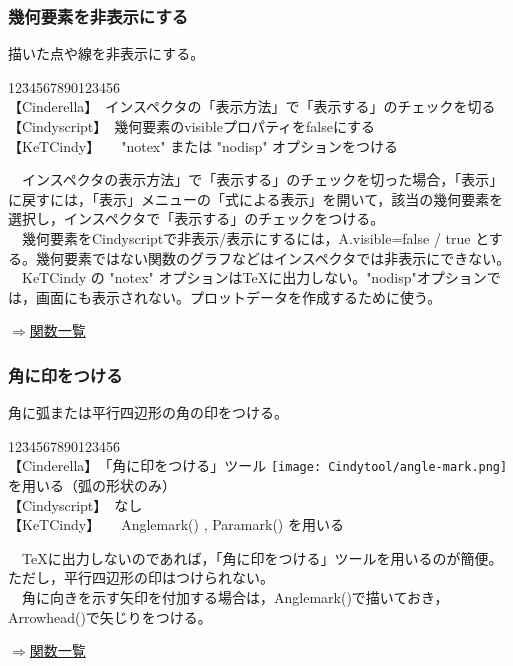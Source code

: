 \documentclass[papersize,a4paper,12pt,uplatex]{jsarticle}
\begin{document}
\subsubsection{幾何要素を非表示にする}
描いた点や線を非表示にする。
\begin{tabbing}
12\=34567890123456\=\kill\\

\>【Cinderella】　\>インスペクタの「表示方法」で「表示する」のチェックを切る　\\ 
\>【Cindyscript】　\>幾何要素のvisibleプロパティをfalseにする　\\
 \>【KeTCindy】　　\>"notex" または "nodisp" オプションをつける 　\\
\end{tabbing}
　インスペクタの表示方法」で「表示する」のチェックを切った場合，「表示」に戻すには，「表示」メニューの「式による表示」を開いて，該当の幾何要素を選択し，インスペクタで「表示する」のチェックをつける。\\
　幾何要素をCindyscriptで非表示/表示にするには，A.visible=false / true とする。幾何要素ではない関数のグラフなどはインスペクタでは非表示にできない。\\
　KeTCindy の "notex" オプションはTeXに出力しない。"nodisp"オプションでは，画面にも表示されない。プロットデータを作成するために使う。\\
\begin{flushright} \hyperlink{functionlist3d}{$\Rightarrow$関数一覧}\end{flushright}


\subsubsection{角に印をつける}
角に弧または平行四辺形の角の印をつける。
\begin{tabbing}
12\=34567890123456\=\kill\\

\>【Cinderella】　\>「角に印をつける」ツール \texttt{[image: Cindytool/angle-mark.png]} を用いる（弧の形状のみ）\\ 
\>【Cindyscript】　\>なし\\
 \>【KeTCindy】　　\>Anglemark() , Paramark() を用いる　\\
\end{tabbing}
　TeXに出力しないのであれば，「角に印をつける」ツールを用いるのが簡便。ただし，平行四辺形の印はつけられない。\\
　角に向きを示す矢印を付加する場合は，Anglemark()で描いておき，Arrowhead()で矢じりをつける。\\
\begin{flushright} \hyperlink{functionlist3d}{$\Rightarrow$関数一覧}\end{flushright}
\end{document}

